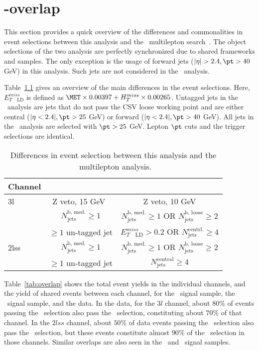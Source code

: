 \chapter{\tHq-\ttH overlap}\label{app:overlap}

This section provides a quick overview of the differences and commonalities in event selections between this analysis and the \ttH\ multilepton search~\cite{CMS_AN_2017-029}. The object selections of the two analysis are perfectly synchronized due to shared frameworks and samples. The only exception is the usage of forward jets ($|\eta|>2.4, \pt>40$ GeV) in this analysis. Such jets are not considered in the \ttH\ analysis.

Table~\ref{tab:seldiffs} gives an overview of the main differences in the event selections. Here, $E^{miss}_{T\quad\text{LD}}$ is defined as $\MET\times0.00397 + H_{T}^{miss}\times0.00265$. Untagged jets in the \tHq\ analysis are jets that do not pass the CSV loose working point and are either central ($|\eta<2.4|, \pt>25$ GeV) or forward ($|\eta<2.4|, \pt>40$ GeV). All jets in the \ttH\ analysis are selected with $\pt>25$ GeV. Lepton $\pt$ cuts and the trigger selections are identical.

\begin{table}[h!]
\centering
\begin{tabular}{l|cc}
	Channel & \tHq & \ttH \\ \hline
	3l   & Z veto, 15 GeV\ & Z veto, 10 GeV\\\ 
	     & $N_\text{jets}^\text{b, med.}\geq1$ &
	       $N_\text{jets}^\text{b, med.}\geq1$ OR
	       $N_\text{jets}^\text{b, loose}\geq2$ \\\ 
	     & $\geq1$ un-tagged jet & $E^{miss}_{T\quad\text{LD}}> 0.2$ OR $N_\text{jets}^\text{centrl.}\geq4$ \\ \hline
	2lss & $N_\text{jets}^\text{b, med.}\geq1$ &
	       $N_\text{jets}^\text{b, med.}\geq1$ OR
	       $N_\text{jets}^\text{b, loose}\geq2$ \\\ 
	     & $\geq1$ un-tagged jet & $N_\text{jets}^\text{central}\geq4$ \\
\end{tabular}
\caption[Differences in event selection \tHq-\ttH\ multilepton analysis.]{Differences in event selection between this analysis and the \ttH\ multilepton analysis.}\label{tab:seldiffs}
\end{table}

Table~\ref{tab:overlap} shows the total event yields in the individual channels, and the yield of shared events between each channel, for the \tHq\ signal sample, the \ttH\ signal sample, and the data.
In the data, for the $3l$ channel, about $80\%$ of events passing the \tHq\ selection also pass the \ttH\ selection, constituting about $70\%$ of that channel. In the $2lss$ channel, about $50\%$ of data events passing the \tHq\ selection also pass the \ttH\ selection, but these events constitute almost $90\%$ of the \ttH\ selection in those channels. Similar overlaps are also seen in the \tHq\ and \ttH\ signal samples.

